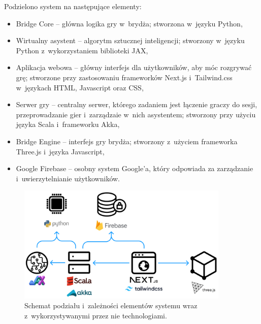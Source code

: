 Podzielono system na następujące elementy:
\begin{itemize}
    \item Bridge Core -- główna logika gry w~brydża; stworzona
          w~języku Python,

    \item Wirtualny asystent -- algorytm sztucznej inteligencji; stworzony
          w~języku Python z~wykorzystaniem biblioteki JAX,

    \item Aplikacja webowa -- główny interfejs dla użytkowników,
          aby móc rozgrywać grę; stworzone przy zastosowaniu
          frameworków Next.js i~Tailwind.css w~językach HTML, \mbox{Javascript}
          oraz CSS,

    \item Serwer gry -- centralny serwer, którego zadaniem jest
          łączenie graczy do sesji, przeprowadzanie gier i~zarządzaie
          w~nich asystentem; stworzony przy użyciu języka Scala
          \mbox{i~frameworku} Akka,

    \item Bridge Engine -- interfejs gry brydża; stworzony
          z~użyciem frameworka Three.js i~języka Javascript,

    \item Google Firebase -- osobny system Google'a, który
          odpowiada za zarządzanie i~uwierzytelnianie użytkowników.
\end{itemize}

\begin{figure}[h!]
    \centering
    \includegraphics[width=0.9\textwidth]{img/schematy/schemat_systemu.png}
    \caption{Schemat podziału i~zależności elementów systemu wraz z~wykorzystywanymi przez nie technologiami.}
    \label{fig:system-scheme}
\end{figure}

